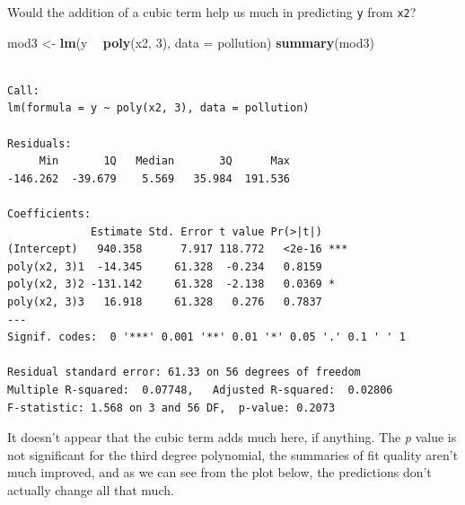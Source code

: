 \documentclass[]{book}
\newenvironment{Shaded}{\begin{snugshade}}{\end{snugshade}}
\newcommand{\KeywordTok}[1]{\textcolor[rgb]{0.13,0.29,0.53}{\textbf{#1}}}
\newcommand{\DataTypeTok}[1]{\textcolor[rgb]{0.13,0.29,0.53}{#1}}
\newcommand{\DecValTok}[1]{\textcolor[rgb]{0.00,0.00,0.81}{#1}}
\newcommand{\StringTok}[1]{\textcolor[rgb]{0.31,0.60,0.02}{#1}}
\newcommand{\OperatorTok}[1]{\textcolor[rgb]{0.81,0.36,0.00}{\textbf{#1}}}
\newcommand{\NormalTok}[1]{#1}
\theoremstyle{definition}
\theoremstyle{definition}
\theoremstyle{definition}
\theoremstyle{remark}
\begin{document}
Would the addition of a cubic term help us much in predicting \texttt{y}
from \texttt{x2}?

\begin{Shaded}
\begin{Highlighting}[]
\NormalTok{mod3 <-}\StringTok{ }\KeywordTok{lm}\NormalTok{(y }\OperatorTok{~}\StringTok{ }\KeywordTok{poly}\NormalTok{(x2, }\DecValTok{3}\NormalTok{), }\DataTypeTok{data =}\NormalTok{ pollution)}
\KeywordTok{summary}\NormalTok{(mod3)}
\end{Highlighting}
\end{Shaded}

\begin{verbatim}

Call:
lm(formula = y ~ poly(x2, 3), data = pollution)

Residuals:
     Min       1Q   Median       3Q      Max 
-146.262  -39.679    5.569   35.984  191.536 

Coefficients:
             Estimate Std. Error t value Pr(>|t|)    
(Intercept)   940.358      7.917 118.772   <2e-16 ***
poly(x2, 3)1  -14.345     61.328  -0.234   0.8159    
poly(x2, 3)2 -131.142     61.328  -2.138   0.0369 *  
poly(x2, 3)3   16.918     61.328   0.276   0.7837    
---
Signif. codes:  0 '***' 0.001 '**' 0.01 '*' 0.05 '.' 0.1 ' ' 1

Residual standard error: 61.33 on 56 degrees of freedom
Multiple R-squared:  0.07748,   Adjusted R-squared:  0.02806 
F-statistic: 1.568 on 3 and 56 DF,  p-value: 0.2073
\end{verbatim}

It doesn't appear that the cubic term adds much here, if anything. The
\emph{p} value is not significant for the third degree polynomial, the
summaries of fit quality aren't much improved, and as we can see from
the plot below, the predictions don't actually change all that much.

\begin{Shaded}
\end{Shaded}
\end{document}
